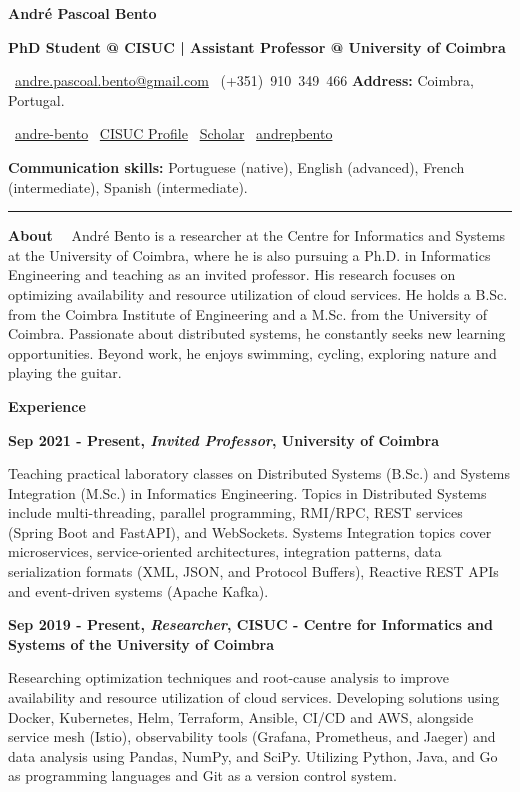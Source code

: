 \documentclass[a4paper,9pt]{memoir}
\newcommand{\cvheading}[1]{{\huge\bfseries\color{RoyalBlue} #1}} %
\newcommand{\cvsubheading}[1]{{\large\bfseries #1} \bigbreak} %
\newcommand{\Sep}{\vspace{1em}} %
\newcommand{\SmallSep}{\vspace{0.5em}} %
\newcommand{\aboutme}[2]{ %
    \textbf{\color{RoyalBlue} #1}~~#2\par\Sep
}
\newcommand{\CVSection}[1]{ %
    {\Large\textbf{#1}}\par
    \SmallSep %
}
\newcommand{\CVItem}[2]{ %
    \textbf{\color{RoyalBlue} #1}\par
    #2
    \SmallSep %
}
\begin{document}
\begin{center}
    \cvheading{\textbf{André Pascoal Bento}}

    \cvsubheading{\Large PhD Student @ CISUC | Assistant Professor @ University of Coimbra}
    
    \faEnvelope~\href{mailto:andre.pascoal.bento@gmail.com}{andre.pascoal.bento@gmail.com} \quad
    \faPhone~(+351)~910~349~466 \quad
    \textbf{Address:} Coimbra, Portugal.

    \faLinkedin~\href{https://www.linkedin.com/in/andre-bento/?locale=en_US}{andre-bento} \quad
    \faGlobe~\href{https://www.cisuc.uc.pt/en/people/apbento}{CISUC Profile} \quad
    \faGoogle~\href{https://scholar.google.com/citations?user=9Yl9gBwAAAAJ&hl=en}{Scholar} \quad
    \faGithub~\href{https://github.com/andrepbento}{andrepbento}

    \textbf{Communication skills:}
    Portuguese (native),
    English (advanced),
    French (intermediate),
    Spanish (intermediate).
    
    \noindent\rule{\linewidth}{0.4pt}
\end{center}


\aboutme{About}{
André Bento is a researcher at the Centre for Informatics and Systems at the University of Coimbra, where he is also pursuing a Ph.D. in Informatics Engineering and teaching as an invited professor. His research focuses on optimizing availability and resource utilization of cloud services.
%
He holds a B.Sc. from the Coimbra Institute of Engineering and a M.Sc. from the University of Coimbra. Passionate about distributed systems, he constantly seeks new learning opportunities. Beyond work, he enjoys swimming, cycling, exploring nature and playing the guitar.
}

\CVSection{Experience}

\CVItem{Sep 2021 - Present, \textit{Invited Professor}, University of Coimbra}{
    Teaching practical laboratory classes on Distributed Systems (B.Sc.) and Systems Integration (M.Sc.) in Informatics Engineering. Topics in Distributed Systems include multi-threading, parallel programming, RMI/RPC, REST services (Spring Boot and FastAPI), and WebSockets. Systems Integration topics cover microservices, service-oriented architectures, integration patterns, data serialization formats (XML, JSON, and Protocol Buffers), Reactive REST APIs and event-driven systems (Apache Kafka).
}

\CVItem{Sep 2019 - Present, \textit{Researcher}, CISUC - Centre for Informatics and Systems of the University of Coimbra}{
    Researching optimization techniques and root-cause analysis to improve availability and resource utilization of cloud services.
    Developing solutions using Docker, Kubernetes, Helm, Terraform, Ansible, CI/CD and AWS, alongside service mesh (Istio), observability tools (Grafana, Prometheus, and Jaeger) and data analysis using Pandas, NumPy, and SciPy. Utilizing Python, Java, and Go as programming languages and Git as a version control system.
}
\end{document}
